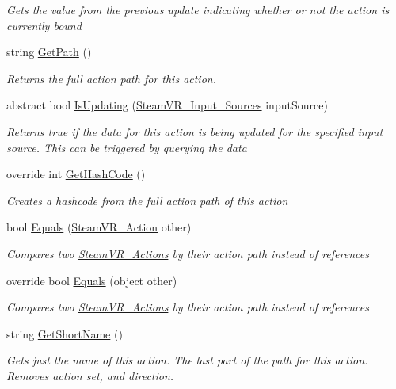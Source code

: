 \begin{DoxyCompactItemize}
\begin{DoxyCompactList}\small\item\em Gets the value from the previous update indicating whether or not the action is currently bound \end{DoxyCompactList}\item 
string \mbox{\hyperlink{class_valve_1_1_v_r_1_1_steam_v_r___action_aa6babacca9654f7d8184b281b99fa004}{Get\+Path}} ()
\begin{DoxyCompactList}\small\item\em Returns the full action path for this action. \end{DoxyCompactList}\item 
abstract bool \mbox{\hyperlink{class_valve_1_1_v_r_1_1_steam_v_r___action_ade2f7fe24302b71484c25419fd94271d}{Is\+Updating}} (\mbox{\hyperlink{namespace_valve_1_1_v_r_a82e5bf501cc3aa155444ee3f0662853f}{Steam\+V\+R\+\_\+\+Input\+\_\+\+Sources}} input\+Source)
\begin{DoxyCompactList}\small\item\em Returns true if the data for this action is being updated for the specified input source. This can be triggered by querying the data \end{DoxyCompactList}\item 
override int \mbox{\hyperlink{class_valve_1_1_v_r_1_1_steam_v_r___action_ae10204d3c1c0f5e01fee7e22c8d56a15}{Get\+Hash\+Code}} ()
\begin{DoxyCompactList}\small\item\em Creates a hashcode from the full action path of this action \end{DoxyCompactList}\item 
bool \mbox{\hyperlink{class_valve_1_1_v_r_1_1_steam_v_r___action_a47cd704e2eab7d9ea4ac09fb257ba4cb}{Equals}} (\mbox{\hyperlink{class_valve_1_1_v_r_1_1_steam_v_r___action}{Steam\+V\+R\+\_\+\+Action}} other)
\begin{DoxyCompactList}\small\item\em Compares two \mbox{\hyperlink{class_valve_1_1_v_r_1_1_steam_v_r___actions}{Steam\+V\+R\+\_\+\+Actions}} by their action path instead of references \end{DoxyCompactList}\item 
override bool \mbox{\hyperlink{class_valve_1_1_v_r_1_1_steam_v_r___action_ac09cc52154a6418bb9782117f519c3b5}{Equals}} (object other)
\begin{DoxyCompactList}\small\item\em Compares two \mbox{\hyperlink{class_valve_1_1_v_r_1_1_steam_v_r___actions}{Steam\+V\+R\+\_\+\+Actions}} by their action path instead of references \end{DoxyCompactList}\item 
string \mbox{\hyperlink{class_valve_1_1_v_r_1_1_steam_v_r___action_a94911ac96600a93ce23790166435b593}{Get\+Short\+Name}} ()
\begin{DoxyCompactList}\small\item\em Gets just the name of this action. The last part of the path for this action. Removes action set, and direction. \end{DoxyCompactList}\end{DoxyCompactItemize}
